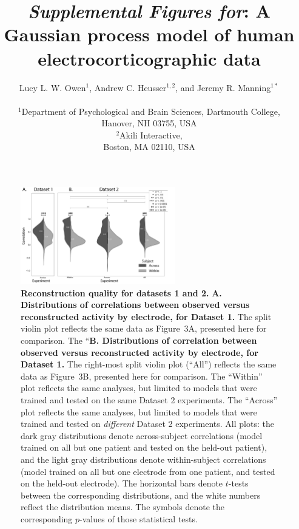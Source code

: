 \documentclass[10pt]{article}
\title{\textit{Supplemental Figures for}: A Gaussian process model of human electrocorticographic data}
\author{
  Lucy L. W. Owen$^{1}$,
  Andrew C. Heusser$^{1, 2}$, and
  Jeremy R. Manning$^{1\ast}$\\\\
$^{1}$Department of Psychological and Brain Sciences, Dartmouth College,\\
Hanover, NH 03755, USA\\
$^{2}$Akili Interactive,\\
Boston, MA 02110, USA}
\begin{document}
\maketitle

\setcounter{equation}{0}
\setcounter{figure}{0}
\setcounter{table}{0}
\setcounter{page}{1}
\setcounter{section}{0}
\makeatletter
\renewcommand{\theequation}{S\arabic{equation}}
\renewcommand{\thefigure}{S\arabic{figure}}
\renewcommand{\bibnumfmt}[1]{[S#1]}
\renewcommand{\citenumfont}[1]{S#1}


\begin{figure}[b!]
\centering
\includegraphics[width=0.6\textwidth]{figs/supplemental_1}
\caption{\textbf{Reconstruction quality for datasets 1 and 2.}
  \textbf{A. Distributions of correlations between observed versus
    reconstructed activity by electrode, for Dataset 1.} The split violin
  plot reflects the same data as Figure~3A, presented here for
  comparison.  The ``\textbf{B. Distributions of correlation between
    observed versus reconstructed activity by electrode, for Dataset
    1.}  The right-most split violin plot (``All'') reflects the same data as Figure~3B,
  presented here for comparison.  The ``Within'' plot reflects the
  same analyses, but limited to models that were trained and tested on
  the same Dataset 2 experiments.  The ``Across'' plot reflects the
  same analyses, but limited to models that were trained and tested on
  \textit{different} Dataset 2 experiments.  All plots: the dark gray
  distributions denote across-subject correlations (model trained on
  all but one patient and tested on the held-out patient), and the
  light gray distributions denote within-subject correlations (model
  trained on all but one electrode from one patient, and tested on the
  held-out electrode).  The horizontal bars denote $t$-tests between
  the corresponding distributions, and the white numbers reflect the
  distribution means.  The symbols denote the corresponding $p$-values
of those statistical tests.}
\label{fig:supplemental_1}
\end{figure}
\end{document}
